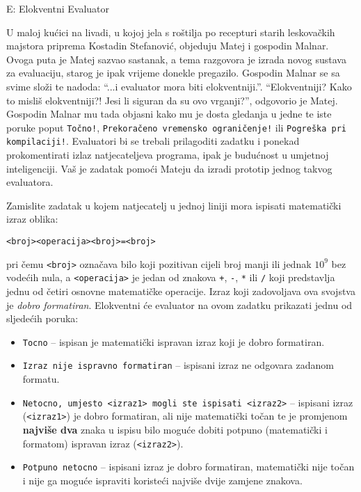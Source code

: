 \begin{statement}[
  timelimit=1 s,
  memorylimit=512 MiB,
]{E: Elokventni Evaluator}

U maloj kućici na livadi, u kojoj jela s roštilja po recepturi starih
leskovačkih majstora priprema Kostadin Stefanović, objeduju Matej i gospodin
Malnar. Ovoga puta je Matej sazvao sastanak, a tema razgovora je izrada novog
sustava za evaluaciju, starog je ipak vrijeme donekle pregazilo.
Gospodin Malnar se sa svime složi te nadoda: ``...i evaluator mora biti
elokventniji.''. ``Elokventniji? Kako to misliš elokventniji?! Jesi li siguran
da su ovo vrganji?'', odgovorio je Matej. Gospodin Malnar mu tada objasni kako mu je
dosta gledanja u jedne te iste poruke poput \texttt{Točno!},
\texttt{Prekoračeno vremensko ograničenje!} ili \texttt{Pogreška pri kompilaciji!}.
Evaluatori bi se trebali prilagoditi zadatku i ponekad prokomentirati izlaz
natjecateljeva programa, ipak je budućnost u umjetnoj inteligenciji. Vaš je
zadatak pomoći Mateju da izradi prototip jednog takvog evaluatora.

Zamislite zadatak u kojem natjecatelj u jednoj liniji mora ispisati matematički
izraz oblika:
\begin{center}
\texttt{<broj><operacija><broj>=<broj>}
\end{center}
pri čemu \texttt{<broj>}
označava bilo koji pozitivan cijeli broj manji ili jednak $10^9$ bez vodećih nula, a
\texttt{<operacija>} je jedan od znakova \texttt{+}, \texttt{-}, \texttt{*} ili
\texttt{/} koji predstavlja jednu od četiri osnovne matematičke operacije. Izraz
koji zadovoljava ova svojstva je \textit{dobro formatiran}.
Elokventni će evaluator na ovom zadatku prikazati jednu od sljedećih poruka:

\begin{itemize}
  \item \texttt{Tocno} -- ispisan je matematički ispravan izraz koji je dobro formatiran.
  \item \texttt{Izraz nije ispravno formatiran} -- ispisani izraz ne odgovara zadanom formatu.
  \item \texttt{Netocno, umjesto <izraz1> mogli ste ispisati <izraz2>} --
    ispisani izraz (\texttt{<izraz1>}) je dobro formatiran, ali nije
    matematički točan te je promjenom \textbf{najviše dva} znaka u ispisu bilo
    moguće dobiti potpuno (matematički i formatom) ispravan izraz (\texttt{<izraz2>}).
  \item \texttt{Potpuno netocno} -- ispisani izraz je dobro formatiran,
    matematički nije točan i nije ga moguće ispraviti koristeći najviše dvije
    zamjene znakova.
\end{itemize}

\end{statement}

